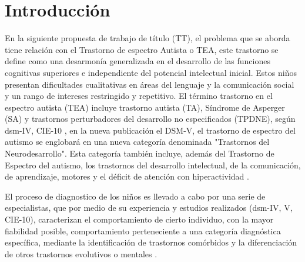 \documentclass[12pt,letterpaper]{article}
\begin{document}
\newpage

\tableofcontents
\newpage

\listoftables
\listoffigures
\newpage



\section{Introducci\'on}
\label{intr}


En la siguiente propuesta de trabajo de t\'itulo (TT), el problema que se aborda 
tiene relaci\'on con el Trastorno de espectro Autista o TEA, este trastorno se 
define como una desarmon\'ia generalizada en el desarrollo de las funciones 
cognitivas superiores e independiente del potencial intelectual inicial. 
Estos ni\~nos presentan dificultades cualitativas en \'areas del lenguaje y 
la comunicaci\'on social y un rango de intereses restringido y repetitivo. 
El t\'ermino trastorno en el espectro autista (TEA) incluye trastorno autista 
(TA), S\'indrome de Asperger (SA) y trastornos perturbadores del desarrollo 
no especificados (TPDNE), seg\'un dsm-IV, CIE-10 \cite{REF2} \cite{REF6} \cite{REF7}, 
en la nueva publicaci\'on el DSM-V, el trastorno de espectro del autismo se englobar\'a 
en una nueva categor\'ia denominada "Trastornos del Neurodesarrollo". 
Esta categor\'ia tambi\'en incluye, adem\'as del Trastorno de Espectro del 
autismo, los trastornos del desarrollo intelectual, de la comunicaci\'on, 
de aprendizaje, motores y el d\'eficit de atenci\'on con hiperactividad \cite{REF3}.

El proceso de diagnostico de los ni\~nos es llevado a cabo por una serie de 
especialistas, que por medio de su experiencia y estudios realizados (dsm-IV, V, CIE-10),
 caracterizan el comportamiento de cierto individuo, con la mayor 
 fiabilidad posible, comportamiento perteneciente a una categor\'ia 
 diagn\'ostica espec\'ifica, mediante la identificaci\'on de trastornos 
 com\'orbidos y la diferenciaci\'on de otros trastornos evolutivos o 
 mentales \cite{REF4}.
\end{document}
